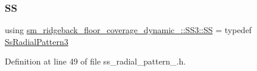 \subsubsection{\texorpdfstring{SS}{SS}}
{\footnotesize\ttfamily using \hyperlink{namespacesm__ridgeback__floor__coverage__dynamic__1_1_1SS3_a365075198199db2a656a36cace4d7cc9}{sm\+\_\+ridgeback\+\_\+floor\+\_\+coverage\+\_\+dynamic\+\_\+::\+S\+S3\+::\+SS} = typedef \hyperlink{structsm__ridgeback__floor__coverage__dynamic__1_1_1SS3_1_1SsRadialPattern3}{Ss\+Radial\+Pattern3}}



Definition at line 49 of file ss\+\_\+radial\+\_\+pattern\+\_.\+h.

